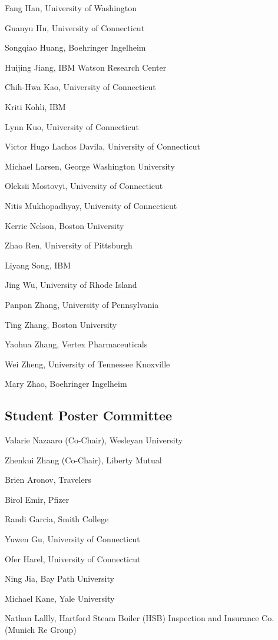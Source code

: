 \documentclass[10pt]{article}
\begin{document}
{Fang Han, University of Washington

Guanyu Hu, University of Connecticut

Songqiao Huang, Boehringer Ingelheim

Huijing Jiang, IBM Watson Research Center

Chih-Hwa Kao, University of Connecticut

Kriti Kohli, IBM

Lynn Kuo, University of Connecticut

Victor Hugo Lachos Davila, University of Connecticut

Michael Larsen, George Washington University

Oleksii Mostovyi, University of Connecticut

Nitis Mukhopadhyay, University of Connecticut

Kerrie Nelson, Boston University

Zhao Ren, University of Pittsburgh

Liyang Song, IBM

Jing Wu, University of Rhode Island

Panpan Zhang, University of Pennsylvania

Ting Zhang, Boston University

Yaohua Zhang, Vertex Pharmaceuticals

Wei Zheng, University of Tennessee Knoxville

Mary Zhao, Boehringer Ingelheim

\subsection*{Student Poster Committee}

Valarie Nazaaro (Co-Chair), Wesleyan University

Zhenkui Zhang (Co-Chair), Liberty Mutual

\bigskip

Brien Aronov, Travelers

Birol Emir, Pfizer

Randi Garcia, Smith College

Yuwen Gu, University of Connecticut

Ofer Harel, University of Connecticut

Ning Jia, Bay Path University

Michael Kane, Yale University

Nathan Lallly, Hartford Steam Boiler (HSB) Inspection and Insurance
Co. (Munich Re Group)

}
\end{document}
